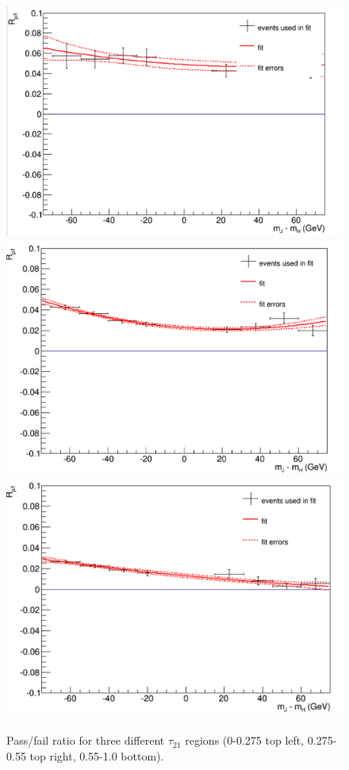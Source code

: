 \begin{figure}[thb!]
\begin{center}
\includegraphics[scale=0.35]{Figures/Rpftau21_0p275.pdf}
\includegraphics[scale=0.35]{Figures/Rpftau21_0p55.pdf}\\
\includegraphics[scale=0.35]{Figures/Rpftau21_1.pdf}
\end{center}
\caption{Pass/fail ratio for three different $\tau_{21}$ regions (0-0.275 top left, 0.275-0.55 top right, 0.55-1.0 bottom).}
\label{fig:tausliceRPF}
\end{figure}


